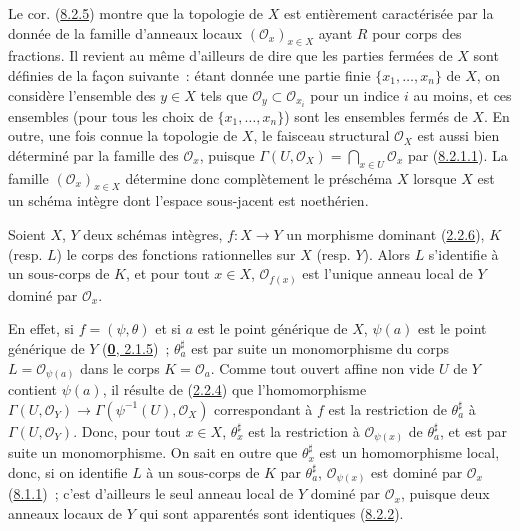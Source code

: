 \begin{env}[8.2.6]
\label{I.8.2.6-fr}
Le cor. (\hyperref[I.8.2.5-fr]{8.2.5}) montre que la topologie de $X$ est
entièrement caractérisée par la donnée de la famille d'anneaux locaux
$(\mathscr{O}_x)_{x\in X}$ ayant $R$ pour corps des fractions. Il revient au
même d'ailleurs de dire que les parties fermées de $X$ sont définies de la
façon suivante~: étant donnée une partie finie
$\{x_1,\ldots,x_n\}$ de $X$, on considère l'ensemble des $y\in X$ tels que
$\mathscr{O}_y\subset\mathscr{O}_{x_i}$ pour un indice $i$ au moins, et ces
ensembles (pour tous les choix de $\{x_1,\ldots,x_n\}$) sont les ensembles
fermés de $X$. En outre, une fois connue la topologie de $X$, le faisceau
structural $\mathscr{O}_X$ est aussi bien déterminé par la famille des
$\mathscr{O}_x$, puisque
$\Gamma(U,\mathscr{O}_X)=\bigcap_{x\in U}\mathscr{O}_x$
par (\hyperref[I.8.2.1.1-fr]{8.2.1.1}). La famille
$(\mathscr{O}_x)_{x\in X}$ détermine donc complètement le préschéma $X$
lorsque $X$ est un schéma intègre dont l'espace sous-jacent est noethérien.
\end{env}

\begin{proposition}[8.2.7]
\label{I.8.2.7-fr}
Soient $X$, $Y$ deux schémas intègres, $f:X\to Y$ un morphisme dominant
\textup{(\hyperref[I.2.2.6-fr]{2.2.6})}, $K$ \textup{(resp. $L$)} le corps des fonctions
rationnelles sur $X$ \textup{(resp. $Y$)}. Alors $L$ s'identifie à un sous-corps de
$K$, et pour tout $x\in X$, $\mathscr{O}_{f(x)}$ est l'unique anneau local de
$Y$ dominé par $\mathscr{O}_x$.
\end{proposition}

En effet, si $f=(\psi,\theta)$ et si $a$ est le point générique de $X$,
$\psi(a)$ est le point générique de $Y$
(\hyperref[0.2.1.5-fr]{\textbf{0}, 2.1.5})~; $\theta_a^\sharp$ est par suite un
monomorphisme du corps $L=\mathscr{O}_{\psi(a)}$ dans le corps
$K=\mathscr{O}_a$. Comme tout ouvert affine non vide $U$ de $Y$ contient
$\psi(a)$, il résulte de (\hyperref[I.2.2.4-fr]{2.2.4}) que l'homomorphisme
$\Gamma(U,\mathscr{O}_Y)\to\Gamma(\psi^{-1}(U),\mathscr{O}_X)$ correspondant
à $f$ est la restriction de $\theta_a^\sharp$ à
$\Gamma(U,\mathscr{O}_Y)$. Donc, pour tout $x\in X$,
$\theta_x^\sharp$ est la restriction à $\mathscr{O}_{\psi(x)}$ de
$\theta_a^\sharp$, et est par suite un monomorphisme. On sait en outre que
$\theta_x^\sharp$ est un homomorphisme local, donc, si on identifie $L$ à un
sous-corps de $K$ par $\theta_a^\sharp$, $\mathscr{O}_{\psi(x)}$ est dominé
par $\mathscr{O}_x$ (\hyperref[I.8.1.1-fr]{8.1.1})~; c'est d'ailleurs le seul
anneau local de $Y$ dominé par $\mathscr{O}_x$, puisque deux anneaux locaux de
$Y$ qui sont apparentés sont identiques
(\hyperref[I.8.2.2-fr]{8.2.2}).

